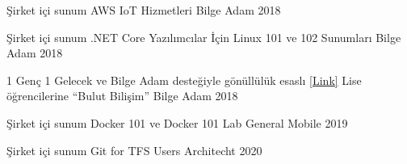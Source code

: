 \begin{cventries}

\cventry
{Şirket içi sunum}
{AWS IoT Hizmetleri}
{Bilge Adam}
{2018}
{}

\cventry
{Şirket içi sunum}
{.NET Core Yazılımcılar İçin Linux 101 ve 102 Sunumları }
{Bilge Adam}
{2018}
{}

\cventry
{
  1 Genç 1 Gelecek ve Bilge Adam desteğiyle gönüllülük esaslı
  {\href{https://www.facebook.com/1genc1gelecek/posts/2229814187260365}{[Link]}}
}
{Lise öğrencilerine ``Bulut Bilişim''}
{Bilge Adam}
{2018}
{}

\cventry
{Şirket içi sunum}
{Docker 101 ve Docker 101 Lab}
{General Mobile}
{2019}
{}

\cventry
{Şirket içi sunum}
{Git for TFS Users}
{Architecht}
{2020}
{}


\end{cventries}
